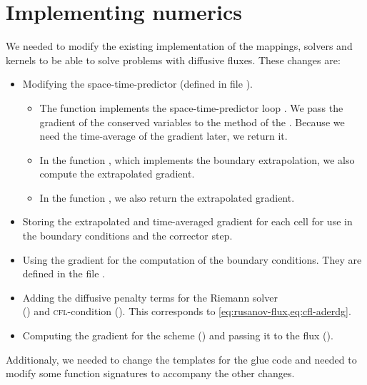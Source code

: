 \section{Implementing numerics}
We needed to modify the existing implementation of the mappings, solvers and kernels to be able to solve problems with diffusive fluxes.
These changes are:
\begin{itemize}
\item Modifying the space-time-predictor (defined in file ).
  \begin{itemize}
  \item The function  implements the space-time-predictor loop .
    We pass the gradient of the conserved variables to the  method of the .
    Because we need the time-average of the gradient later, we return it.
   \item In the function , which implements the boundary extrapolation, we also compute the extrapolated gradient.
    \item In the function , we also return the extrapolated gradient.
  \end{itemize}
\item Storing the extrapolated and time-averaged gradient for each cell for use in the boundary conditions and the corrector step.
\item Using the gradient for the computation of the boundary conditions.
  They are defined in the file .
\item Adding the diffusive penalty terms for the Riemann solver\\() and \textsc{cfl}-condition ().
  This corresponds to \cref{eq:rusanov-flux,eq:cfl-aderdg}.
\item Computing the gradient for the \muscl{} scheme () and passing it to the flux ().
\end{itemize}
Additionaly, we needed to change the templates for the glue code and needed to modify some function signatures to accompany the other changes.

